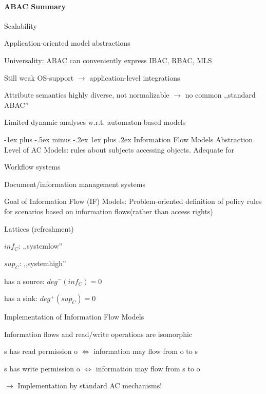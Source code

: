 \documentclass[a4paper]{article}
\makeatletter
\renewcommand{\subsubsection}{\@startsection{subsubsection}{3}{0mm}%
                                {-1ex plus -.5ex minus -.2ex}%
                                {1ex plus .2ex}%
                                {\normalfont\small\bfseries}}
\makeatother
\begin{document}
\begin{multicols}{3}
    \paragraph{ABAC Summary}
    \begin{itemize*}
        \item Scalability
        \item Application-oriented model abstractions
        \item Universality: ABAC can conveniently express IBAC, RBAC, MLS
        \item Still weak OS-support $\rightarrow$ application-level integrations
        \item Attribute semantics highly diverse, not normalizable $\rightarrow$ no common ,,standard ABAC''
        \item Limited dynamic analyses w.r.t. automaton-based models
    \end{itemize*}

    \subsubsection{Information Flow Models}
    Abstraction Level of AC Models: rules about subjects accessing objects. Adequate for
    \begin{itemize*}
        \item Workflow systems
        \item Document/information management systems
    \end{itemize*}

    Goal of Information Flow (IF) Models: Problem-oriented definition of policy rules for scenarios based on information flows(rather than access rights)

    Lattices (refreshment)
    \begin{itemize*}
        \item $inf_C$: ,,systemlow''
        \item $sup_C$: ,,systemhigh''
        \item has a source: $deg^-(inf_C)= 0$
        \item has a sink: $deg^+(sup_C)= 0$
    \end{itemize*}

    Implementation of Information Flow Models
    \begin{itemize*}
        \item Information flows and read/write operations are isomorphic
        \begin{itemize*}
            \item s has read permission o $\Leftrightarrow$ information may flow from o to s
            \item s has write permission o $\Leftrightarrow$ information may flow from s to o
        \end{itemize*}
        \item $\rightarrow$ Implementation by standard AC mechanisms!
    \end{itemize*}


\end{multicols}
\end{document}

